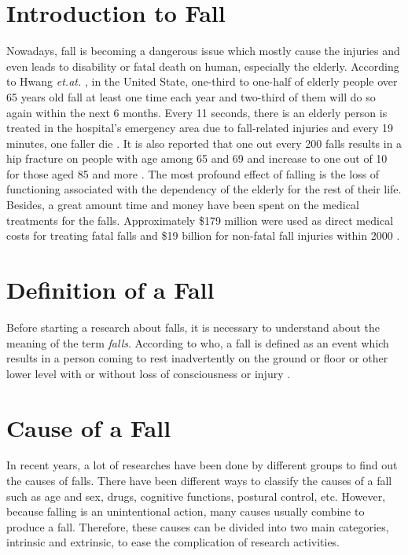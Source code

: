 \documentclass[letterpaper,12pt,titlepage,oneside,final]{book}
\begin{document}
\section{Introduction to Fall}
Nowadays, fall is becoming a dangerous issue which mostly cause the injuries and even leads to disability or fatal death on human, especially the elderly. According to Hwang \textit{et.at.} \cite{static1}, in the United State, one-third to one-half of elderly people over 65 years old fall at least one time each year  and two-third of them will do so again within the next 6 months. Every 11 seconds, there is an elderly person is treated in the hospital's emergency area due to fall-related injuries and every 19 minutes, one faller die \cite{ncoa}. It is also reported that one out every 200 falls results in a hip fracture on people with age among 65 and 69 and increase to one out of 10 for those aged 85 and more \cite{hip_fracture}. The most profound effect of falling is the loss of functioning associated with the dependency of the elderly for the rest of their life. Besides, a great amount time and money have been spent on the medical treatments for the falls. Approximately \$179 million were used as direct medical costs for treating fatal falls and \$19 billion for non-fatal fall injuries within 2000 \cite{cost_fatal}.

\section{Definition of a Fall}
Before starting a research about falls, it is necessary to understand about the meaning of the term \textit{falls}. According to \gls{who}, a fall is defined as an event which results in a person coming to rest inadvertently on the ground or floor or other lower level with or without loss of consciousness or injury \cite{who}. 

\section{Cause of a Fall}
In recent years, a lot of researches have been done by different groups to find out the causes of falls. There have been different ways to classify the causes of a fall such as age and sex, drugs, cognitive functions, postural control, etc. However, because falling is an unintentional action, many causes usually combine to produce a fall. Therefore, these causes can be divided into two main categories, intrinsic and extrinsic, to ease the complication of research activities.
\end{document}

